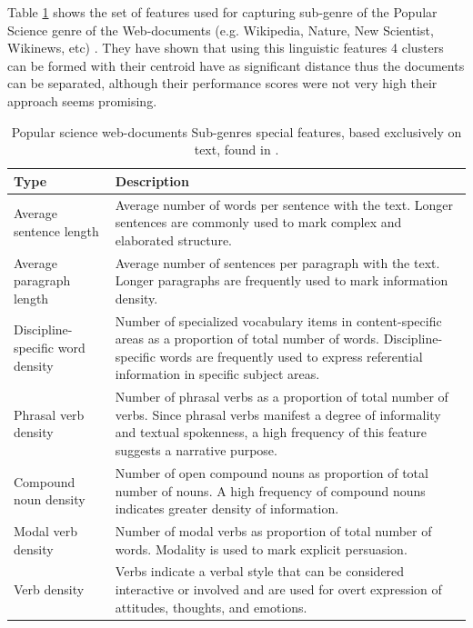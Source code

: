 Table \ref{chap:relevant_work:tbl:pop_science_features} shows the set of features used for capturing sub-genre of the  Popular Science genre of the  Web-documents (e.g. Wikipedia, Nature, New Scientist, Wikinews, etc) \parencite{lieungnapar2017genre}. They have shown that using this linguistic features 4 clusters can be formed with their centroid have as significant distance thus the documents can be separated, although their performance scores were not very high their approach seems promising. 

\begin{table}[t]
	\center
	\caption {Popular science web-documents Sub-genres special features, based exclusively on text, found in \parencite{lieungnapar2017genre}.}\label{chap:relevant_work:tbl:pop_science_features}
	\begin{tabular}{p{2cm}p{12cm}}
		\hline
		Type & Description \\
		\hline
		Average sentence length & Average number of words per sentence with the text. Longer sentences are commonly used to mark complex and elaborated structure. \\
        \hline
        Average paragraph length & Average number of sentences per paragraph with the text. Longer paragraphs are frequently used to mark information density. \\
        \hline
        Discipline-specific word density & Number of specialized vocabulary items in content-specific areas as a proportion of total number of words. Discipline-specific words are frequently used to express referential information in specific subject areas. \\
        \hline
        Phrasal verb density & Number of phrasal verbs as a proportion of total number of verbs. Since phrasal verbs manifest a degree of informality and textual spokenness, a high frequency of this feature suggests a narrative purpose. \\
        \hline
        Compound noun density & Number of open compound nouns as proportion of total number of nouns. A high frequency of compound nouns indicates greater density of information. \\
        \hline
        Modal verb density & Number of modal verbs as proportion of total number of words. Modality is used to mark explicit persuasion.  \\
        \hline
        Verb density &  Verbs indicate a verbal style that can be considered interactive or involved and are used for overt expression of attitudes, thoughts, and emotions. \\

\end{tabular}
\end{table}
